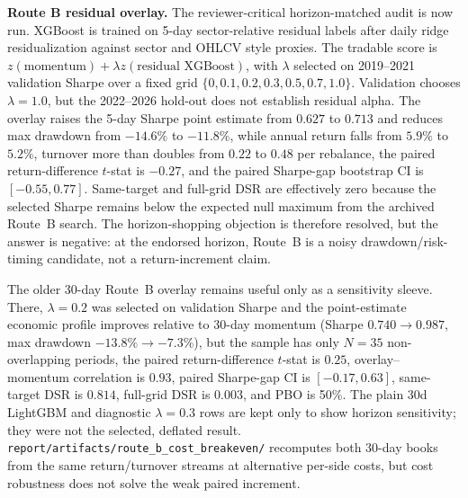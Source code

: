 \documentclass[9pt]{extarticle}
\begin{document}
\textbf{Route B residual overlay.} The reviewer-critical horizon-matched audit is
now run. XGBoost is trained on 5-day sector-relative residual labels after daily
ridge residualization against sector and OHLCV style proxies. The tradable score
is $z(\text{momentum})+\lambda z(\text{residual XGBoost})$, with $\lambda$
selected on 2019--2021 validation Sharpe over a fixed grid
$\{0,0.1,0.2,0.3,0.5,0.7,1.0\}$. Validation chooses $\lambda=1.0$, but the
2022--2026 hold-out does not establish residual alpha. The overlay raises the
5-day Sharpe point estimate from $0.627$ to $0.713$ and reduces max drawdown
from $-14.6\%$ to $-11.8\%$, while annual return falls from $5.9\%$ to $5.2\%$,
turnover more than doubles from $0.22$ to $0.48$ per rebalance, the paired
return-difference $t$-stat is $-0.27$, and the paired Sharpe-gap bootstrap CI is
$[-0.55,0.77]$. Same-target and full-grid DSR are effectively zero because the
selected Sharpe remains below the expected null maximum from the archived Route~B
search. The horizon-shopping objection is therefore resolved, but the answer is
negative: at the endorsed horizon, Route~B is a noisy drawdown/risk-timing
candidate, not a return-increment claim.

The older 30-day Route~B overlay remains useful only as a sensitivity sleeve.
There, $\lambda=0.2$ was selected on validation Sharpe and the point-estimate
economic profile improves relative to 30-day momentum (Sharpe
$0.740\rightarrow0.987$, max drawdown $-13.8\%\rightarrow-7.3\%$), but the
sample has only $N=35$ non-overlapping periods, the paired return-difference
$t$-stat is $0.25$, overlay--momentum correlation is $0.93$, paired Sharpe-gap
CI is $[-0.17,0.63]$, same-target DSR is $0.814$, full-grid DSR is $0.003$, and
PBO is 50\%. The plain 30d LightGBM and diagnostic $\lambda=0.3$ rows are kept
only to show horizon sensitivity; they were not the selected, deflated result.
\texttt{report/artifacts/route\_b\_cost\_breakeven/} recomputes both 30-day
books from the same return/turnover streams at alternative per-side costs, but
cost robustness does not solve the weak paired increment.
\end{document}
